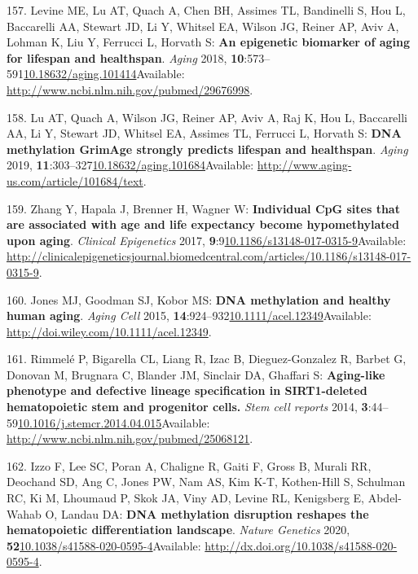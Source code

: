 \documentclass[
]{book}
\begin{document}
\leavevmode\hypertarget{ref-Levine2018}{}%
157. Levine ME, Lu AT, Quach A, Chen BH, Assimes TL, Bandinelli S, Hou L, Baccarelli AA, Stewart JD, Li Y, Whitsel EA, Wilson JG, Reiner AP, Aviv A, Lohman K, Liu Y, Ferrucci L, Horvath S: \textbf{An epigenetic biomarker of aging for lifespan and healthspan}. \emph{Aging} 2018, \textbf{10}:573--591\href{https://doi.org/10.18632/aging.101414}{10.18632/aging.101414}Available: \url{http://www.ncbi.nlm.nih.gov/pubmed/29676998}.

\leavevmode\hypertarget{ref-Lu2019}{}%
158. Lu AT, Quach A, Wilson JG, Reiner AP, Aviv A, Raj K, Hou L, Baccarelli AA, Li Y, Stewart JD, Whitsel EA, Assimes TL, Ferrucci L, Horvath S: \textbf{DNA methylation GrimAge strongly predicts lifespan and healthspan}. \emph{Aging} 2019, \textbf{11}:303--327\href{https://doi.org/10.18632/aging.101684}{10.18632/aging.101684}Available: \url{http://www.aging-us.com/article/101684/text}.

\leavevmode\hypertarget{ref-Zhang2017}{}%
159. Zhang Y, Hapala J, Brenner H, Wagner W: \textbf{Individual CpG sites that are associated with age and life expectancy become hypomethylated upon aging}. \emph{Clinical Epigenetics} 2017, \textbf{9}:9\href{https://doi.org/10.1186/s13148-017-0315-9}{10.1186/s13148-017-0315-9}Available: \url{http://clinicalepigeneticsjournal.biomedcentral.com/articles/10.1186/s13148-017-0315-9}.

\leavevmode\hypertarget{ref-Jones2015}{}%
160. Jones MJ, Goodman SJ, Kobor MS: \textbf{DNA methylation and healthy human aging}. \emph{Aging Cell} 2015, \textbf{14}:924--932\href{https://doi.org/10.1111/acel.12349}{10.1111/acel.12349}Available: \url{http://doi.wiley.com/10.1111/acel.12349}.

\leavevmode\hypertarget{ref-Rimmele2014}{}%
161. Rimmelé P, Bigarella CL, Liang R, Izac B, Dieguez-Gonzalez R, Barbet G, Donovan M, Brugnara C, Blander JM, Sinclair DA, Ghaffari S: \textbf{Aging-like phenotype and defective lineage specification in SIRT1-deleted hematopoietic stem and progenitor cells.} \emph{Stem cell reports} 2014, \textbf{3}:44--59\href{https://doi.org/10.1016/j.stemcr.2014.04.015}{10.1016/j.stemcr.2014.04.015}Available: \url{http://www.ncbi.nlm.nih.gov/pubmed/25068121}.

\leavevmode\hypertarget{ref-Izzo2020}{}%
162. Izzo F, Lee SC, Poran A, Chaligne R, Gaiti F, Gross B, Murali RR, Deochand SD, Ang C, Jones PW, Nam AS, Kim K-T, Kothen-Hill S, Schulman RC, Ki M, Lhoumaud P, Skok JA, Viny AD, Levine RL, Kenigsberg E, Abdel-Wahab O, Landau DA: \textbf{DNA methylation disruption reshapes the hematopoietic differentiation landscape}. \emph{Nature Genetics} 2020, \textbf{52}\href{https://doi.org/10.1038/s41588-020-0595-4}{10.1038/s41588-020-0595-4}Available: \url{http://dx.doi.org/10.1038/s41588-020-0595-4}.
\end{document}

